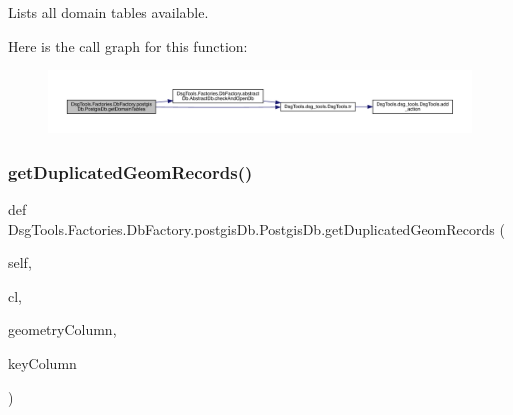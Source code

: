 \begin{DoxyVerb}Lists all domain tables available.
\end{DoxyVerb}
 Here is the call graph for this function\+:
\nopagebreak
\begin{figure}[H]
\begin{center}
\leavevmode
\includegraphics[width=350pt]{class_dsg_tools_1_1_factories_1_1_db_factory_1_1postgis_db_1_1_postgis_db_a4cc2bf6b8b10081da2a49870dbc4d33a_cgraph}
\end{center}
\end{figure}
\mbox{\label{class_dsg_tools_1_1_factories_1_1_db_factory_1_1postgis_db_1_1_postgis_db_a38b56f5d9cb251ec95560f2204a95779}} 
\subsubsection{\texorpdfstring{get\+Duplicated\+Geom\+Records()}{getDuplicatedGeomRecords()}}
{\footnotesize\ttfamily def Dsg\+Tools.\+Factories.\+Db\+Factory.\+postgis\+Db.\+Postgis\+Db.\+get\+Duplicated\+Geom\+Records (\begin{DoxyParamCaption}\item[{}]{self,  }\item[{}]{cl,  }\item[{}]{geometry\+Column,  }\item[{}]{key\+Column }\end{DoxyParamCaption})}

